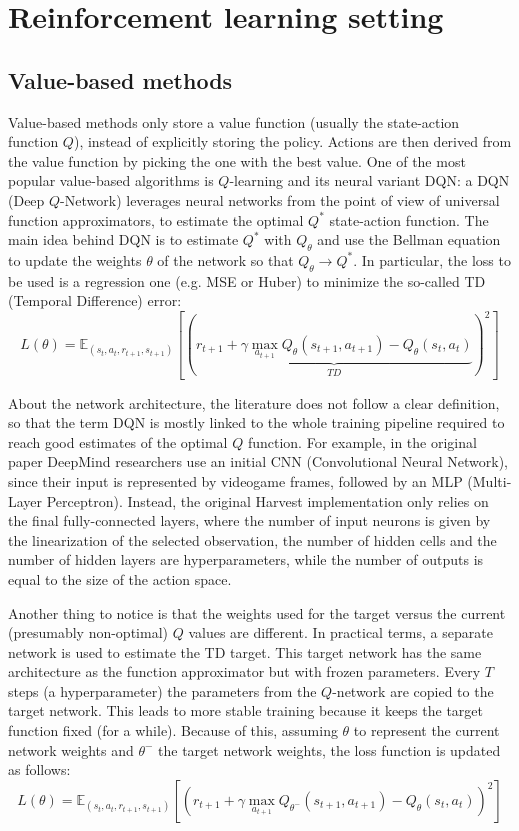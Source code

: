 \documentclass{article}
\begin{document}
\newpage


\newpage
\appendix
\section{Reinforcement learning setting}

\subsection{Value-based methods}
Value-based methods only store a value function (usually the state-action function $Q$), instead of explicitly storing the policy. Actions are then derived from the value function by picking the one with the best value. One of the most popular value-based algorithms is $Q$-learning and its neural variant DQN: a DQN (Deep $Q$-Network) \cite{dqn} leverages neural networks from the point of view of universal function approximators, to estimate the optimal $Q^*$ state-action function. The main idea behind DQN is to estimate $Q^*$ with $Q_\theta$ and use the Bellman equation to update the weights $\theta$ of the network so that $Q_\theta\rightarrow Q^*$. In particular, the loss to be used is a regression one (e.g. MSE or Huber) to minimize the so-called TD (Temporal Difference) error:
$$
L(\theta)=\mathbb{E}_{(s_t,a_t,r_{t+1},s_{t+1})}\left[\left(\underbrace{r_{t+1}+\gamma\max_{a_{t+1}}Q_\theta(s_{t+1}, a_{t+1}) - Q_\theta(s_t, a_t)}_{TD}\right)^2\right]
$$

About the network architecture, the literature does not follow a clear definition, so that the term DQN is mostly linked to the whole training pipeline required to reach good estimates of the optimal $Q$ function. For example, in the original paper \cite{dqn} DeepMind researchers use an initial CNN (Convolutional Neural Network), since their input is represented by videogame frames, followed by an MLP (Multi-Layer Perceptron). Instead, the original Harvest implementation \cite{harvest} only relies on the final fully-connected layers, where the number of input neurons is given by the linearization of the selected observation, the number of hidden cells and the number of hidden layers are hyperparameters, while the number of outputs is equal to the size of the action space. 

Another thing to notice is that the weights used for the target versus the current (presumably non-optimal) $Q$ values are different. In practical terms, a separate network is used to estimate the TD target. This target network has the same architecture as the function approximator but with frozen parameters. Every $T$ steps (a hyperparameter) the parameters from the $Q$-network are copied to the target network. This leads to more stable training because it keeps the target function fixed (for a while). Because of this, assuming $\theta$ to represent the current network weights and $\theta^{-}$ the target network weights, the loss function is updated as follows:
$$
L(\theta)=\mathbb{E}_{(s_t,a_t,r_{t+1},s_{t+1})}\left[\left(r_{t+1}+\gamma\max_{a_{t+1}}Q_{\theta^{-}}(s_{t+1}, a_{t+1}) - Q_{\theta}(s_t, a_t)\right)^2\right]
$$
\end{document}
